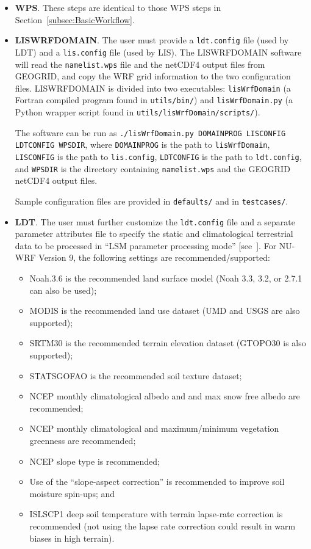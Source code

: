 \begin{itemize}
\item \textbf{WPS}. These steps are identical to those WPS steps in 
Section~\ref{subsec:BasicWorkflow}.
\item \textbf{LISWRFDOMAIN}. The user must provide a \texttt{ldt.config} file 
  (used by LDT) and a \texttt{lis.config} file (used by LIS).  The LISWRFDOMAIN 
  software will read the \texttt{namelist.wps} file and the netCDF4 output 
  files from GEOGRID, and copy the WRF grid information to the two 
  configuration files. LISWRFDOMAIN is divided into two executables: 
  \texttt{lisWrfDomain} (a Fortran compiled program found in 
  \texttt{utils/bin/}) and \texttt{lisWrfDomain.py} (a Python wrapper
  script found in \texttt{utils/lisWrfDomain/scripts/}).  

  The software can be run as 
  \texttt{./lisWrfDomain.py DOMAINPROG LISCONFIG LDTCONFIG WPSDIR}, 
  where \texttt{DOMAINPROG} is the path to \texttt{lisWrfDomain}, 
  \texttt{LISCONFIG} is the path to \texttt{lis.config},
  \texttt{LDTCONFIG} is the path to \texttt{ldt.config},
  and \texttt{WPSDIR} is the directory containing \texttt{namelist.wps}
  and the GEOGRID netCDF4 output files.

  Sample configuration files are provided in \texttt{defaults/} and in 
  \texttt{testcases/}.

\item \textbf{LDT}. The user must further customize the \texttt{ldt.config}
  file and a separate parameter attributes file to specify the static 
  and climatological terrestrial data to be processed in ``LSM parameter 
  processing mode'' [see~\cite{ref:LdtUserGuide}].  For NU-WRF Version 9, the 
  following settings are recommended/supported:
  \begin{itemize}
  \item Noah.3.6 is the recommended land surface model (Noah 3.3, 3.2, or 2.7.1
    can also be used);
  \item MODIS is the recommended land use dataset (UMD and USGS are also 
    supported);
  \item SRTM30 is the recommended terrain elevation dataset (GTOPO30 is also
    supported);
  \item STATSGOFAO is the recommended soil texture dataset;
  \item NCEP monthly climatological albedo and and max snow free albedo are
    recommended;
  \item NCEP monthly climatological and maximum/minimum vegetation greenness
    are recommended; 
  \item NCEP slope type is recommended;
  \item Use of the ``slope-aspect correction'' is recommended to improve
    soil moisture spin-ups; and
  \item ISLSCP1 deep soil temperature with terrain lapse-rate correction is
    recommended (not using the lapse rate correction could result in warm
    biases in high terrain).
    

\end{itemize}
\end{itemize}
